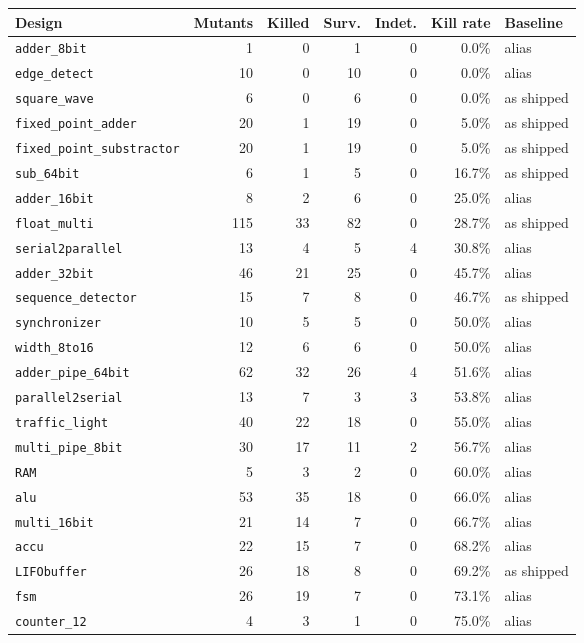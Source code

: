 \begin{tabular}{lrrrrrl}
\toprule
Design & Mutants & Killed & Surv. & Indet. & Kill rate & Baseline \\
\midrule
\texttt{adder\_8bit} & 1 & 0 & 1 & 0 & 0.0\% & alias \\
\texttt{edge\_detect} & 10 & 0 & 10 & 0 & 0.0\% & alias \\
\texttt{square\_wave} & 6 & 0 & 6 & 0 & 0.0\% & as shipped \\
\texttt{fixed\_point\_adder} & 20 & 1 & 19 & 0 & 5.0\% & as shipped \\
\texttt{fixed\_point\_substractor} & 20 & 1 & 19 & 0 & 5.0\% & as shipped \\
\texttt{sub\_64bit} & 6 & 1 & 5 & 0 & 16.7\% & as shipped \\
\texttt{adder\_16bit} & 8 & 2 & 6 & 0 & 25.0\% & alias \\
\texttt{float\_multi} & 115 & 33 & 82 & 0 & 28.7\% & as shipped \\
\texttt{serial2parallel} & 13 & 4 & 5 & 4 & 30.8\% & alias \\
\texttt{adder\_32bit} & 46 & 21 & 25 & 0 & 45.7\% & alias \\
\texttt{sequence\_detector} & 15 & 7 & 8 & 0 & 46.7\% & as shipped \\
\texttt{synchronizer} & 10 & 5 & 5 & 0 & 50.0\% & alias \\
\texttt{width\_8to16} & 12 & 6 & 6 & 0 & 50.0\% & alias \\
\texttt{adder\_pipe\_64bit} & 62 & 32 & 26 & 4 & 51.6\% & alias \\
\texttt{parallel2serial} & 13 & 7 & 3 & 3 & 53.8\% & alias \\
\texttt{traffic\_light} & 40 & 22 & 18 & 0 & 55.0\% & alias \\
\texttt{multi\_pipe\_8bit} & 30 & 17 & 11 & 2 & 56.7\% & alias \\
\texttt{RAM} & 5 & 3 & 2 & 0 & 60.0\% & alias \\
\texttt{alu} & 53 & 35 & 18 & 0 & 66.0\% & alias \\
\texttt{multi\_16bit} & 21 & 14 & 7 & 0 & 66.7\% & alias \\
\texttt{accu} & 22 & 15 & 7 & 0 & 68.2\% & alias \\
\texttt{LIFObuffer} & 26 & 18 & 8 & 0 & 69.2\% & as shipped \\
\texttt{fsm} & 26 & 19 & 7 & 0 & 73.1\% & alias \\
\texttt{counter\_12} & 4 & 3 & 1 & 0 & 75.0\% & alias \\

\end{tabular}
